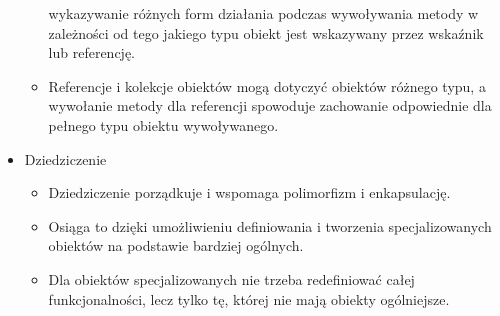 \documentclass[a4paper]{article}
\begin{document}
\begin{itemize}
\begin{itemize}
            wykazywanie różnych form działania podczas
            wywoływania metody w zależności od tego jakiego
            typu obiekt jest wskazywany przez wskaźnik lub
            referencję.
            \item Referencje i kolekcje obiektów mogą dotyczyć
            obiektów różnego typu, a wywołanie metody dla
            referencji spowoduje zachowanie odpowiednie dla
            pełnego typu obiektu wywoływanego.
        \end{itemize}
        \item Dziedziczenie\\
        \begin{itemize}
            \item Dziedziczenie porządkuje i wspomaga polimorfizm i
            enkapsulację.
            \item Osiąga to dzięki umożliwieniu definiowania i
            tworzenia specjalizowanych obiektów na podstawie
            bardziej ogólnych.
            \item Dla obiektów specjalizowanych nie trzeba
            redefiniować całej funkcjonalności, lecz tylko tę,
            której nie mają obiekty ogólniejsze.
        \end{itemize}
    \end{itemize}
\end{document}
